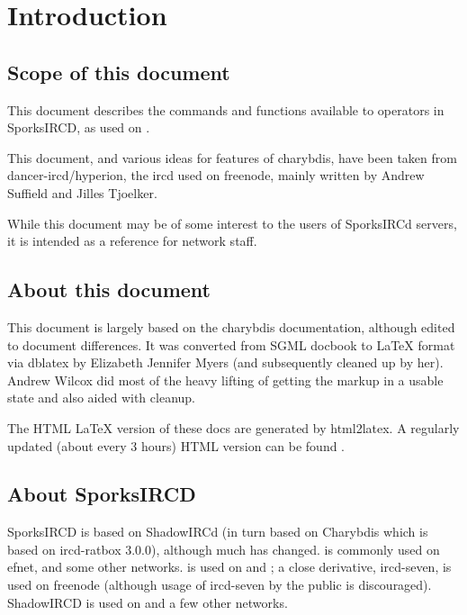 \chapter{Introduction}
\label{intro}

\section{Scope of this document}

	This document describes the commands and functions available to
	operators in SporksIRCD, as used on
	.

	This document, and various ideas for features of charybdis, have
	been taken from dancer-{}ircd/hyperion, the ircd used on freenode,
	mainly written by Andrew Suffield and Jilles Tjoelker.

	While this document may be of some interest to the users of SporksIRCd
	servers, it is intended as a reference for network staff.


\section{About this document}
	This document is largely based on the charybdis documentation, although
	edited to document differences. It was converted from SGML docbook to
	LaTeX format via dblatex by Elizabeth Jennifer Myers (and subsequently
	cleaned up by her). Andrew Wilcox did most of the heavy lifting of
	getting the markup in a usable state and also aided with cleanup.

	The HTML LaTeX version of these docs are generated by html2latex. A
	regularly updated (about every 3 hours) HTML version can be found
	.


\section{About SporksIRCD}
	SporksIRCD is based on ShadowIRCd (in turn based on Charybdis which is
	based on ircd-{}ratbox 3.0.0), although much has changed.
	 is
	commonly used on efnet, and some other networks.
	is used on  and
	; a close
	derivative, ircd-seven, is used on freenode (although usage of
	ircd-seven by the public is discouraged). ShadowIRCD is used on
	 and a few other
	networks.
